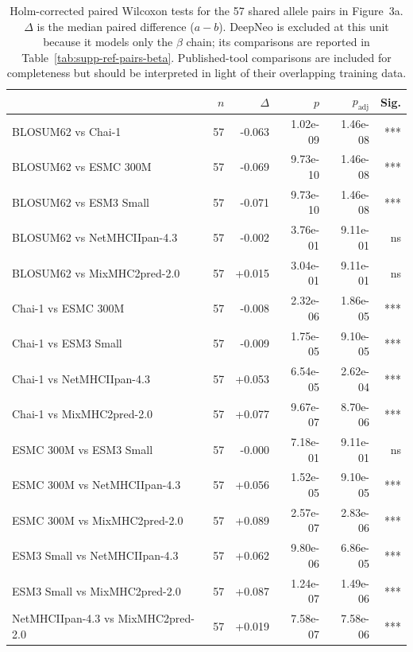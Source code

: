 \begin{table}[H]
\centering
\small
\caption{Holm-corrected paired Wilcoxon tests for the 57 shared allele pairs in Figure~3a. $\Delta$ is the median paired difference ($a-b$). DeepNeo is excluded at this unit because it models only the $\beta$ chain; its comparisons are reported in Table~\ref{tab:supp-ref-pairs-beta}. Published-tool comparisons are included for completeness but should be interpreted in light of their overlapping training data.}
\label{tab:supp-ref-pairs}
\begin{tabular}{lrrrrr}
\toprule
 & \textbf{$n$} & \textbf{$\Delta$} & \textbf{$p$} & \textbf{$p_{\mathrm{adj}}$} & \textbf{Sig.} \\
\midrule
BLOSUM62 vs Chai-1 & 57 & -0.063 & 1.02e-09 & 1.46e-08 & *** \\
BLOSUM62 vs ESMC 300M & 57 & -0.069 & 9.73e-10 & 1.46e-08 & *** \\
BLOSUM62 vs ESM3 Small & 57 & -0.071 & 9.73e-10 & 1.46e-08 & *** \\
BLOSUM62 vs NetMHCIIpan-4.3 & 57 & -0.002 & 3.76e-01 & 9.11e-01 & ns \\
BLOSUM62 vs MixMHC2pred-2.0 & 57 & +0.015 & 3.04e-01 & 9.11e-01 & ns \\
Chai-1 vs ESMC 300M & 57 & -0.008 & 2.32e-06 & 1.86e-05 & *** \\
Chai-1 vs ESM3 Small & 57 & -0.009 & 1.75e-05 & 9.10e-05 & *** \\
Chai-1 vs NetMHCIIpan-4.3 & 57 & +0.053 & 6.54e-05 & 2.62e-04 & *** \\
Chai-1 vs MixMHC2pred-2.0 & 57 & +0.077 & 9.67e-07 & 8.70e-06 & *** \\
ESMC 300M vs ESM3 Small & 57 & -0.000 & 7.18e-01 & 9.11e-01 & ns \\
ESMC 300M vs NetMHCIIpan-4.3 & 57 & +0.056 & 1.52e-05 & 9.10e-05 & *** \\
ESMC 300M vs MixMHC2pred-2.0 & 57 & +0.089 & 2.57e-07 & 2.83e-06 & *** \\
ESM3 Small vs NetMHCIIpan-4.3 & 57 & +0.062 & 9.80e-06 & 6.86e-05 & *** \\
ESM3 Small vs MixMHC2pred-2.0 & 57 & +0.087 & 1.24e-07 & 1.49e-06 & *** \\
NetMHCIIpan-4.3 vs MixMHC2pred-2.0 & 57 & +0.019 & 7.58e-07 & 7.58e-06 & *** \\
\bottomrule
\end{tabular}
\end{table}

